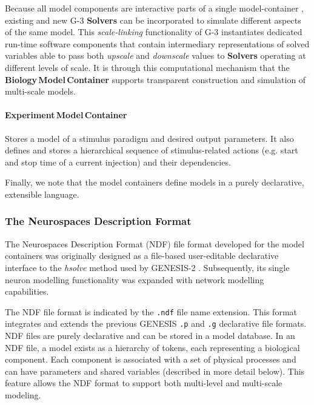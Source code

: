 \documentclass{article}
\begin{document}
Because all model components are interactive parts of a single
model-container \cite{10.1371/journal.pone.0028956}, existing and
new G-3 {\bf Solvers} can be incorporated to simulate different aspects of the
same model.  This {\em scale-linking} functionality of G-3
instantiates dedicated run-time software components that contain
intermediary representations of solved variables able to pass both
{\em upscale} and {\em downscale} values to {\bf Solvers} operating at different
levels of scale.
It is through this computational mechanism that the {\bf Biology\,Model\,Container} 
supports transparent construction and simulation of multi-scale models.

\paragraph{Experiment\,Model\,Container}
Stores a model of a stimulus paradigm and desired output parameters.
It also defines and stores a hierarchical sequence of stimulus-related
actions (e.g. start and stop time of a current injection) and their
dependencies.

Finally, we note that the model containers define models in a purely declarative,
extensible language.

\subsubsection{The Neurospaces Description Format}

The Neurospaces Description Format (NDF) file format developed for the model containers
was originally designed as a file-based user-editable declarative
interface to the {\it hsolve} method used by GENESIS-2
\cite{cornelis03:_neuros}\cite{beeman12:_years_comput_neuros}.
Subsequently, its single neuron modelling functionality was expanded
with network modelling capabilities.

The NDF file format is indicated by the {\tt .ndf} file name
extension. This format integrates and extends the previous GENESIS
{\tt .p} and {\tt .g} declarative file formats.  NDF files are purely
declarative and can be stored in a model database. In an NDF file, a
model exists as a hierarchy of tokens, each representing a biological
component.  Each component is associated with a set of physical
processes and can have parameters and shared variables (described in
more detail below).  This feature allows the NDF format to support
both multi-level and multi-scale modeling.
\end{document}
